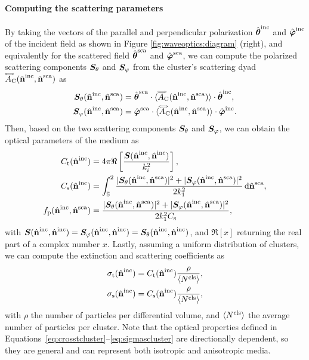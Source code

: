 \paragraph{Computing the scattering parameters}
By taking the vectors of the parallel and perpendicular polarization ${\hat{\bm\theta}}^\mathrm{inc}$ and ${\hat{\bm\varphi}}^\mathrm{inc}$ of the incident field as shown in Figure \ref{fig:waveoptics:diagram} (right), and equivalently for the scattered field ${\hat{\bm\theta}}^\mathrm{sca}$ and ${\hat{\bm\varphi}}^\mathrm{sca}$, we can compute the polarized scattering components $\bm{S}_\theta$ and $\bm{S}_\varphi$ from the cluster's scattering dyad ${\accentset{\Longleftrightarrow}{A}}_{\mathrm{C}}({\hat{\mathbf{n}}}^\mathrm{inc},{\hat{\mathbf{n}}}^\mathrm{sca})$ as
\begin{align}
  \bm{S}_\theta({\hat{\mathbf{n}}}^\mathrm{inc},{\hat{\mathbf{n}}}^\mathrm{sca}) &= {\hat{\bm\theta}}^\mathrm{sca} \cdot {\langle {\accentset{\Longleftrightarrow}{A}}_{\mathrm{C}}({\hat{\mathbf{n}}}^\mathrm{inc},{\hat{\mathbf{n}}}^\mathrm{sca}) \rangle} \cdot {\hat{\bm\theta}}^\mathrm{inc}, \nonumber \\
  \bm{S}_\varphi({\hat{\mathbf{n}}}^\mathrm{inc},{\hat{\mathbf{n}}}^\mathrm{sca}) &= {\hat{\bm\varphi}}^\mathrm{sca} \cdot {\langle {\accentset{\Longleftrightarrow}{A}}_{\mathrm{C}}({\hat{\mathbf{n}}}^\mathrm{inc},{\hat{\mathbf{n}}}^\mathrm{sca}) \rangle} \cdot {\hat{\bm\varphi}}^\mathrm{inc}.
\end{align}
Then, based on the two scattering components $\bm{S}_\theta$ and $\bm{S}_\varphi$, we can obtain the optical parameters of the medium as
\begin{align}
    \label{eq:crosstcluster}
    \Ct(\hatbfni) &= 4\pi \Re\left[\frac{\bmS(\hatbfni,\hatbfni)}{k_i^2}\right], \\
    \label{eq:crossscluster}
    \Cs(\hatbfni) &=\int_\bbSS \frac{|\bmStheta(\hatbfnis)|^2+|\bmSphi(\hatbfnis)|^2}{2k_1^2} \intd \hatbfns, \\
    \label{eq:phasecluster}
    \fp(\hatbfnis) &= \frac{|\bmStheta(\hatbfnis)|^2+|\bmSphi(\hatbfnis)|^2}{2k_1^2\Cs},
\end{align}
with $\bm{S}({\hat{\mathbf{n}}}^\mathrm{inc},{\hat{\mathbf{n}}}^\mathrm{inc})=\bm{S}_\varphi({\hat{\mathbf{n}}}^\mathrm{inc},{\hat{\mathbf{n}}}^\mathrm{inc})=\bm{S}_\theta({\hat{\mathbf{n}}}^\mathrm{inc},{\hat{\mathbf{n}}}^\mathrm{inc})$, and $\Re[x]$ returning the real part of a complex number $x$. Lastly, assuming a uniform distribution of clusters, we can compute the extinction and scattering coefficients as
\begin{align}
    \label{eq:sigmatcluster}
    \sigmat(\hatbfni) &= \Ct(\hatbfni) \frac{\rho}{\EV{\Ncls}}, \\
    \label{eq:sigmascluster}
    \sigmas(\hatbfni) &= \Cs(\hatbfni) \frac{\rho}{\EV{\Ncls}},
\end{align}
with $\rho$ the number of particles per differential volume, and ${\langle N^\mathrm{cls} \rangle}$ the average number of particles per cluster. Note that the optical properties defined in Equations~\eqref{eq:crosstcluster}--\eqref{eq:sigmascluster} are directionally dependent, so they are general and can represent both isotropic and anisotropic media. 


